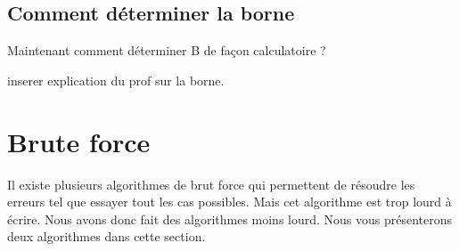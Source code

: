 \documentclass[a4paper, 11pt]{report}
\begin{document}
\section{Comment déterminer la borne}


Maintenant comment déterminer B de façon calculatoire ? \newline

inserer explication du prof sur la borne.

\newpage

\chapter{Brute force}

Il existe plusieurs algorithmes de brut force qui permettent de résoudre les erreurs tel que essayer tout les cas possibles. Mais cet algorithme est trop lourd à écrire. Nous avons donc fait des algorithmes moins lourd.
Nous vous présenterons deux algorithmes dans cette section.
\end{document}
